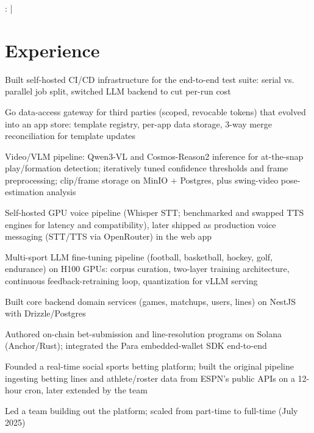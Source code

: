 \documentclass[]{jack-resume}
\begin{document}
\raggedright{
    :
      \href{https://www.linkedin.com/in/jack-sturtevant/}{ \ExternalLink} |
     \href{https://github.com/jacksturt}{ \ExternalLink}}


\section{Experience}

\begin{tightemize}
    \item Built self-hosted CI/CD infrastructure for the end-to-end test suite: serial vs. parallel job split, switched LLM backend to cut per-run cost
    \item Go data-access gateway for third parties (scoped, revocable tokens) that evolved into an app store: template registry, per-app data storage, 3-way merge reconciliation for template updates
    \item Video/VLM pipeline: Qwen3-VL and Cosmos-Reason2 inference for at-the-snap play/formation detection; iteratively tuned confidence thresholds and frame preprocessing; clip/frame storage on MinIO + Postgres, plus swing-video pose-estimation analysis
    \item Self-hosted GPU voice pipeline (Whisper STT; benchmarked and swapped TTS engines for latency and compatibility), later shipped as production voice messaging (STT/TTS via OpenRouter) in the web app
    \item Multi-sport LLM fine-tuning pipeline (football, basketball, hockey, golf, endurance) on H100 GPUs: corpus curation, two-layer training architecture, continuous feedback-retraining loop, quantization for vLLM serving
\end{tightemize}
\sectionsep

\begin{tightemize}
    \item Built core backend domain services (games, matchups, users, lines) on NestJS with Drizzle/Postgres
    \item Authored on-chain bet-submission and line-resolution programs on Solana (Anchor/Rust); integrated the Para embedded-wallet SDK end-to-end
    \item Founded a real-time social sports betting platform; built the original pipeline ingesting betting lines and athlete/roster data from ESPN's public APIs on a 12-hour cron, later extended by the team
    \item Led a team building out the platform; scaled from part-time to full-time (July 2025)
\end{tightemize}
\sectionsep
\end{document}
